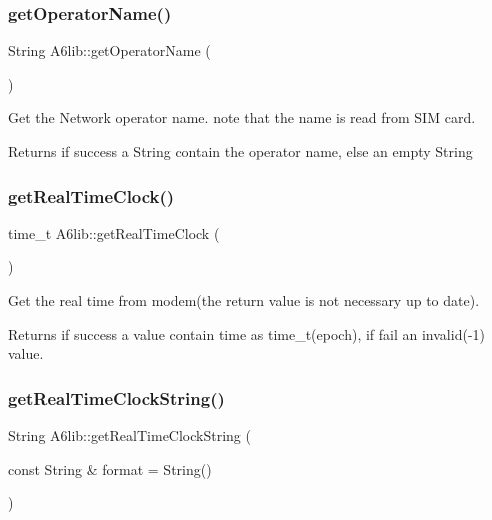 \subsubsection{\texorpdfstring{get\+Operator\+Name()}{getOperatorName()}}
{\footnotesize\ttfamily String A6lib\+::get\+Operator\+Name (\begin{DoxyParamCaption}{ }\end{DoxyParamCaption})}

Get the Network operator name. note that the name is read from S\+IM card. \begin{DoxyReturn}{Returns}
if success a String contain the operator name, else an empty String 
\end{DoxyReturn}
\mbox{\label{class_a6lib_aaae53e03a783490c15898843f81498c4}} 
\subsubsection{\texorpdfstring{get\+Real\+Time\+Clock()}{getRealTimeClock()}}
{\footnotesize\ttfamily time\+\_\+t A6lib\+::get\+Real\+Time\+Clock (\begin{DoxyParamCaption}{ }\end{DoxyParamCaption})}

Get the real time from modem(the return value is not necessary up to date). \begin{DoxyReturn}{Returns}
if success a value contain time as time\+\_\+t(epoch), if fail an invalid(-\/1) value. 
\end{DoxyReturn}
\mbox{\label{class_a6lib_a332dca9ec1dabb54b51535f2c5350aae}} 
\subsubsection{\texorpdfstring{get\+Real\+Time\+Clock\+String()}{getRealTimeClockString()}}
{\footnotesize\ttfamily String A6lib\+::get\+Real\+Time\+Clock\+String (\begin{DoxyParamCaption}\item[{const String \&}]{format = {\ttfamily String()} }\end{DoxyParamCaption})}

